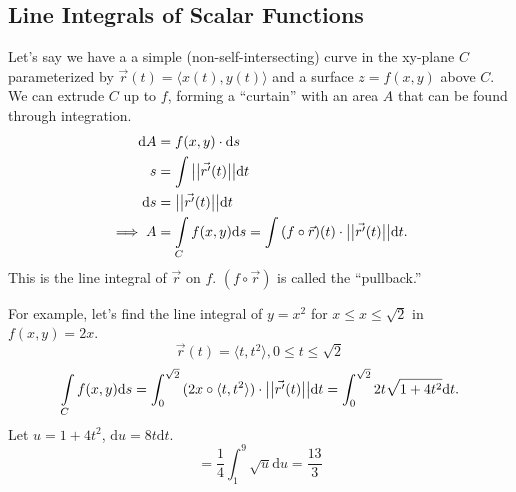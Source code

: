 \subsection{Line Integrals of Scalar Functions}
\noindent
Let's say we have a a simple (non-self-intersecting) curve in the xy-plane $C$ parameterized by $\vec{r}(t) = \langle x(t), y(t)\rangle$ and a surface $z = f(x,y)$ above $C$. We can extrude $C$ up to $f$, forming a ``curtain'' with an area $A$ that can be found through integration.
\begin{align*}
	\mathrm{d}A &= f(x,y) \cdot \mathrm{d}s	\\
	s &= \int{\big\lvert \big\lvert \vec{r^\prime}(t) \big\rvert \big\rvert\mathrm{d}t} \\
	\mathrm{d}s &= \big\lvert \big\lvert \vec{r'}(t) \big\rvert \big\rvert\mathrm{d}t \\
	\implies A &= \int\limits_{C}{f(x,y)\mathrm{d}s} = \int{(f\circ\vec{r})(t) \cdot \big\lvert \big\lvert \vec{r^\prime}(t) \big\rvert \big\rvert\mathrm{d}t}.
\end{align*}
This is the line integral of $\vec{r}$ on $f$. $(f\circ\vec{r})$ is called the ``pullback.''

\noindent
For example, let's find the line integral of $y = x^2$ for $x \leq x \leq \sqrt{2}$ in $f(x,y) = 2x$.
\begin{equation*}
	\vec{r}(t) = \langle t, t^2 \rangle, 0 \leq t \leq \sqrt{2}
\end{equation*}
\begin{equation*}
	\int\limits_{C}{f(x,y)\mathrm{d}s} = \int_{0}^{\sqrt{2}}{(2x \circ \langle t, t^2\rangle) \cdot \big\lvert \big\lvert \vec{r^\prime}(t) \big\rvert \big\rvert\mathrm{d}t} = \int_{0}^{\sqrt{2}}{2t\sqrt{1 + 4t^2}\mathrm{d}t}.
\end{equation*}
Let $u = 1+4t^2$, $\mathrm{d}u = 8t\mathrm{d}t$.
\begin{equation*}
	= \frac{1}{4}\int_{1}^{9}{\sqrt{u}\mathrm{d}u} = \frac{13}{3}
\end{equation*}